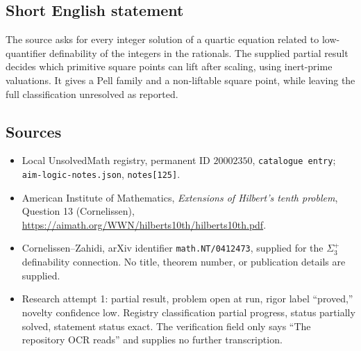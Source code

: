 \documentclass[11pt]{article}
\begin{document}
\subsection{Short English statement}
The source asks for every integer solution of a quartic equation related to low-quantifier definability of the integers in the rationals. The supplied partial result decides which primitive square points can lift after scaling, using inert-prime valuations. It gives a Pell family and a non-liftable square point, while leaving the full classification unresolved as reported.
\subsection{Sources}
\begin{itemize}
\item Local UnsolvedMath registry, permanent ID $20002350$, \texttt{catalogue entry}; \texttt{aim-logic-notes.json}, \texttt{notes[125]}.
\item American Institute of Mathematics, \emph{Extensions of Hilbert's tenth problem}, Question 13 (Cornelissen), \url{https://aimath.org/WWN/hilberts10th/hilberts10th.pdf}.
\item Cornelissen--Zahidi, arXiv identifier \texttt{math.NT/0412473}, supplied for the $\Sigma_3^+$ definability connection. No title, theorem number, or publication details are supplied.
\item Research attempt 1: partial result, problem open at run, rigor label ``proved,'' novelty confidence low. Registry classification partial progress, status partially solved, statement status exact. The verification field only says ``The repository OCR reads'' and supplies no further transcription.
\end{itemize}
\end{document}

